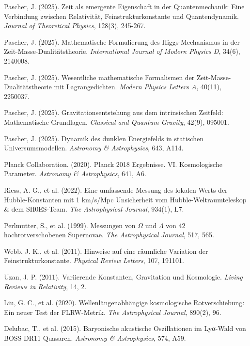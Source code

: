 \documentclass[a4paper,12pt]{article}
\theoremstyle{definition}
\theoremstyle{remark}
\begin{document}
	\begin{thebibliography}{99}
		 Pascher, J. (2025). Zeit als emergente Eigenschaft in der Quantenmechanik: Eine Verbindung zwischen Relativität, Feinstrukturkonstante und Quantendynamik. \textit{Journal of Theoretical Physics}, 128(3), 245-267.
		
		 Pascher, J. (2025). Mathematische Formulierung des Higgs-Mechanismus in der Zeit-Masse-Dualitätstheorie. \textit{International Journal of Modern Physics D}, 34(6), 2140008.
		
		 Pascher, J. (2025). Wesentliche mathematische Formalismen der Zeit-Masse-Dualitätstheorie mit Lagrangedichten. \textit{Modern Physics Letters A}, 40(11), 2250037.
		
		 Pascher, J. (2025). Gravitationsentstehung aus dem intrinsischen Zeitfeld: Mathematische Grundlagen. \textit{Classical and Quantum Gravity}, 42(9), 095001.
		
		 Pascher, J. (2025). Dynamik des dunklen Energiefelds in statischen Universumsmodellen. \textit{Astronomy \& Astrophysics}, 643, A114.
		
		 Planck Collaboration. (2020). Planck 2018 Ergebnisse. VI. Kosmologische Parameter. \textit{Astronomy \& Astrophysics}, 641, A6.
		
		 Riess, A. G., et al. (2022). Eine umfassende Messung des lokalen Werts der Hubble-Konstanten mit 1 km/s/Mpc Unsicherheit vom Hubble-Weltraumteleskop \& dem SH0ES-Team. \textit{The Astrophysical Journal}, 934(1), L7.
		
		 Perlmutter, S., et al. (1999). Messungen von $\Omega$ und $\Lambda$ von 42 hochrotverschobenen Supernovae. \textit{The Astrophysical Journal}, 517, 565.
		
		 Webb, J. K., et al. (2011). Hinweise auf eine räumliche Variation der Feinstrukturkonstante. \textit{Physical Review Letters}, 107, 191101.
		
		 Uzan, J. P. (2011). Variierende Konstanten, Gravitation und Kosmologie. \textit{Living Reviews in Relativity}, 14, 2.
		
		 Liu, G. C., et al. (2020). Wellenlängenabhängige kosmologische Rotverschiebung: Ein neuer Test der FLRW-Metrik. \textit{The Astrophysical Journal}, 890(2), 96.
		
		 Delubac, T., et al. (2015). Baryonische akustische Oszillationen im Lyα-Wald von BOSS DR11 Quasaren. \textit{Astronomy \& Astrophysics}, 574, A59.
		

\end{thebibliography}
\end{document}
